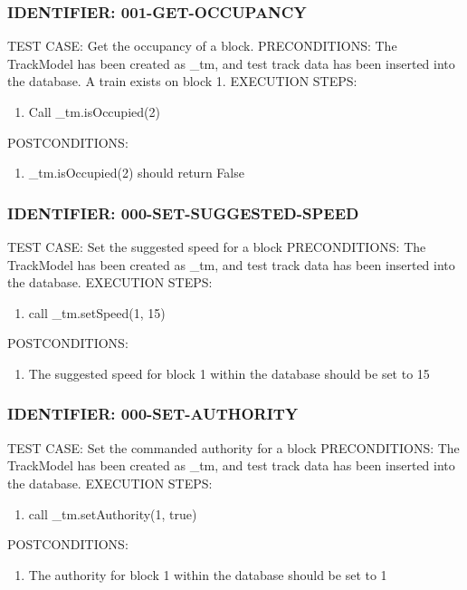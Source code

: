 \documentclass{scrreprt}
\begin{document}
\subsubsection{IDENTIFIER: 001-GET-OCCUPANCY}
TEST CASE: Get the occupancy of a block.
PRECONDITIONS: The TrackModel has been created as _tm, and test track data has been inserted into the database. A train exists on block 1.
EXECUTION STEPS:
\begin{enumerate}
	\item Call _tm.isOccupied(2)
\end{enumerate}
POSTCONDITIONS:
\begin{enumerate}
	\item _tm.isOccupied(2) should return False
\end{enumerate}

\subsubsection{IDENTIFIER: 000-SET-SUGGESTED-SPEED}
TEST CASE: Set the suggested speed for a block
PRECONDITIONS: The TrackModel has been created as _tm, and test track data has been inserted into the database.
EXECUTION STEPS:
\begin{enumerate}
	\item call _tm.setSpeed(1, 15)
\end{enumerate}
POSTCONDITIONS:
\begin{enumerate}
	\item The suggested speed for block 1 within the database should be set to 15
\end{enumerate}

\subsubsection{IDENTIFIER: 000-SET-AUTHORITY}
TEST CASE: Set the commanded authority for a block
PRECONDITIONS: The TrackModel has been created as _tm, and test track data has been inserted into the database.
EXECUTION STEPS:
\begin{enumerate}
	\item call _tm.setAuthority(1, true)
\end{enumerate}
POSTCONDITIONS:
\begin{enumerate}
	\item The authority for block 1 within the database should be set to 1
\end{enumerate}
\end{document}
